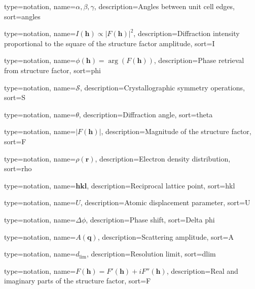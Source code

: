 {
  type=notation,
  name={\ensuremath{\alpha, \beta, \gamma}},
  description={Angles between unit cell edges},
  sort={angles}
}

{
  type=notation,
  name={\ensuremath{I(\mathbf{h}) \propto |F(\mathbf{h})|^2}},
  description={Diffraction intensity proportional to the square of the structure factor amplitude},
  sort={I}
}

{
  type=notation,
  name={\ensuremath{\phi(\mathbf{h}) = \arg(F(\mathbf{h}))}},
  description={Phase retrieval from structure factor},
  sort={phi}
}

{
  type=notation,
  name={\ensuremath{\mathcal{S}}},
  description={Crystallographic symmetry operations},
  sort={S}
}

{
  type=notation,
  name={\ensuremath{\theta}},
  description={Diffraction angle},
  sort={theta}
}

{
  type=notation,
  name={\ensuremath{|F(\mathbf{h})|}},
  description={Magnitude of the structure factor},
  sort={F}
}

{
  type=notation,
  name={\ensuremath{\rho(\mathbf{r})}},
  description={Electron density distribution},
  sort={rho}
}

{
  type=notation,
  name={\ensuremath{\mathbf{hkl}}},
  description={Reciprocal lattice point},
  sort={hkl}
}

{
  type=notation,
  name={\ensuremath{U}},
  description={Atomic displacement parameter},
  sort={U}
}

{
  type=notation,
  name={\ensuremath{\Delta \phi}},
  description={Phase shift},
  sort={Delta phi}
}

{
  type=notation,
  name={\ensuremath{A(\mathbf{q})}},
  description={Scattering amplitude},
  sort={A}
}

{
  type=notation,
  name={\ensuremath{d_{\text{lim}}}},
  description={Resolution limit},
  sort={dlim}
}

{
  type=notation,
  name={\ensuremath{F(\mathbf{h}) = F'(\mathbf{h}) + iF''(\mathbf{h})}},
  description={Real and imaginary parts of the structure factor},
  sort={F}
}
